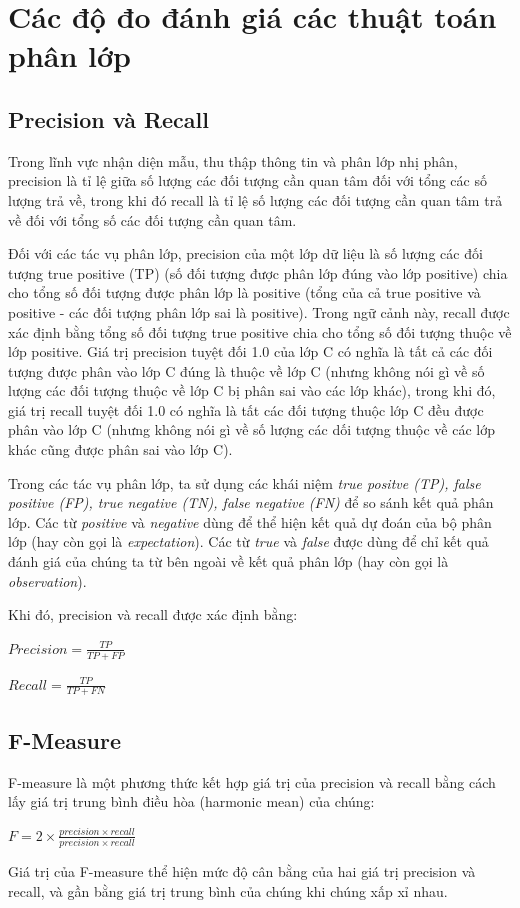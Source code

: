 \section{Các độ đo đánh giá các thuật toán phân lớp}
\subsection{Precision và Recall}
Trong lĩnh vực nhận diện mẫu, thu thập thông tin và phân lớp nhị phân, precision là tỉ lệ giữa số lượng các đối tượng cần quan tâm đối với tổng các số lượng trả về, trong khi đó recall là tỉ lệ số lượng các đối tượng cần quan tâm trả về đối với tổng số các đối tượng cần quan tâm.

Đối với các tác vụ phân lớp, precision của một lớp dữ liệu là số lượng các đối tượng true positive (TP) (số đối tượng được phân lớp đúng vào lớp positive) chia cho tổng số đối tượng được phân lớp là positive (tổng của cả true positive và positive - các đối tượng phân lớp sai là positive). Trong ngữ cảnh này, recall được xác định bằng tổng số đối tượng true positive chia cho tổng số đối tượng thuộc về lớp positive. Giá trị precision tuyệt đối 1.0 của lớp C có nghĩa là tất cả các đối tượng được phân vào lớp C đúng là thuộc về lớp C (nhưng không nói gì về số lượng các đối tượng thuộc về lớp C bị phân sai vào các lớp khác), trong khi đó, giá trị recall tuyệt đối 1.0 có nghĩa là tất các đối tượng thuộc lớp C đều được phân vào lớp C (nhưng không nói gì về số lượng các dối tượng thuộc về các lớp khác cũng được phân sai vào lớp C).

Trong các tác vụ phân lớp, ta sử dụng các khái niệm \textit{true positve (TP), false positive (FP), true negative (TN), false negative (FN)} để so sánh kết quả phân lớp. Các từ \textit{positive} và \textit{negative} dùng để thể hiện kết quả dự đoán của bộ phân lớp (hay còn gọi là \textit{expectation}). Các từ \textit{true} và \textit{false} được dùng để chỉ kết quả đánh giá của chúng ta từ bên ngoài về kết quả phân lớp (hay còn gọi là  \textit{observation}).

Khi đó, precision và recall được xác định bằng:
\begin{center}
  $Precision = \frac{TP}{TP + FP}$
\end{center}
\begin{center}
  $Recall  = \frac{TP}{TP + FN}$
\end{center}
\subsection{F-Measure}
F-measure là một phương thức kết hợp giá trị của precision và recall bằng cách lấy giá trị trung bình điều hòa (harmonic mean) của chúng:
\begin{center}
  $F = 2\times \frac{precision\times recall}{precision\times recall}$
\end{center}
Giá trị của F-measure thể hiện mức độ cân bằng của hai giá trị precision và recall, và gần bằng giá trị trung bình của chúng khi chúng xấp xỉ nhau.
